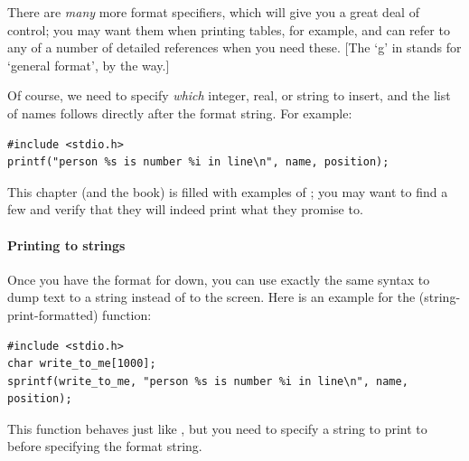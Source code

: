 \documentclass[12pt]{article}
\makeatletter
\def\ttind#1{\index{#1@\cinline{#1}}\cinline{#1}}
\makeatother
\begin{document}
\begin{center}
\end{center}

There are {\sl many} more format specifiers, which will give you a great deal of control; you may want
them when printing tables, for example, and can refer to any of a number of detailed references when you
need these. [The `g' in  stands for `general format', by the way.]

Of course, we need to specify {\sl which} integer, real, or string to insert, and the list of names
follows directly after the format string. For example:
\begin{lstlisting}
#include <stdio.h>
printf("person %s is number %i in line\n", name, position);
\end{lstlisting}
This chapter (and the book) is filled with examples of \ttind{printf}; you may want to find a few and
verify that they will indeed print what they promise to.

\paragraph{Printing to strings} Once you have the format for  down, you can use exactly the
same syntax to dump text to a string instead of to the screen. Here is an example for the 
(string-print-formatted) function:
\begin{lstlisting}
#include <stdio.h>
char write_to_me[1000];
sprintf(write_to_me, "person %s is number %i in line\n", name, position);
\end{lstlisting}
This function behaves just like , but you need to specify
a string to print to before specifying the format string. 
\end{document}

